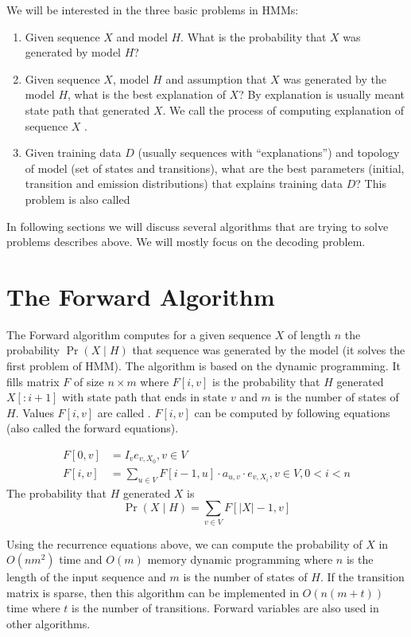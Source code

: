 We will be interested in the three basic problems in HMMs:
\begin{enumerate}
\item Given sequence $X$ and model $H$. What is the probability that $X$ was
generated by model $H$?
\item Given sequence $X$, model $H$ and assumption that $X$ was generated by the
model
$H$, what is the best explanation of $X$? By explanation is usually meant state
path that generated $X$. We call the process of computing explanation of
sequence $X$ .
\item Given training data $D$ (usually sequences with ``explanations'') and
topology of model (set of states and transitions), what are the best parameters
(initial, transition and emission distributions) that explains training
data $D$? This problem is also called 
\end{enumerate} 
In following sections we will discuss several algorithms
that are trying to solve problems describes above. We will mostly focus on the
decoding problem.


\section{The Forward Algorithm}
The Forward algorithm \cite{Durbin1998} computes for a given sequence $X$ of
length $n$ the probability $\Pr\left(X\mid H\right)$ that sequence was
generated by the model (it solves the first problem of HMM). The algorithm is
based on the dynamic programming. It fills
matrix $F$ of size $n\times m$ where $F[i,v]$ is the probability that $H$
generated $X[:i+1]$ with state path that ends in state $v$ and $m$ is the number
of states of $H$. Values $F[i,v]$ are  called . $F[i,v]$ can be computed by following equations (also called the
forward equations).

\begin{align}
F[0,v] &= I_ve_{v,X_0}, v\in V\\
F[i,v] &= \sum_{u\in V}F[i-1,u] \cdot a_{u,v} \cdot e_{v,X_i}, v\in V,0< i < n
\end{align}
The probability that $H$ generated $X$ is 
 \[\Pr\left(X\mid H\right) = \sum_{v\in V} F[|X|-1,v]\]

Using the recurrence equations above, we can compute the probability of $X$ in
$O(nm^2)$ time and $O(m)$ memory dynamic programming where $n$ is the length
of the input sequence and $m$ is the number of states of $H$. If the transition
matrix is sparse, then this algorithm can be implemented in $O(n(m+t))$ time
where $t$ is the number of transitions.  Forward variables are also used in other
algorithms. 

